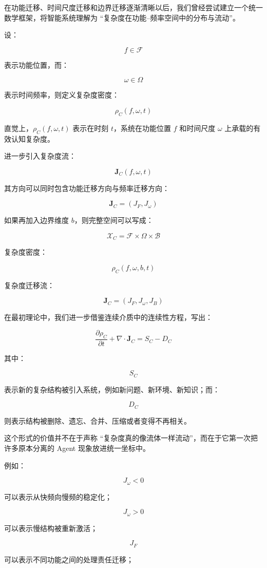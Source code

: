 在功能迁移、时间尺度迁移和边界迁移逐渐清晰以后，我们曾经尝试建立一个统一数学框架，将智能系统理解为 ``复杂度在功能--频率空间中的分布与流动''。

设：

\[
f\in\mathcal F
\]

表示功能位置，而：

\[
\omega\in\Omega
\]

表示时间频率，则定义复杂度密度：

\[
\rho_C(f,\omega,t)
\]

直觉上，$\rho_C(f,\omega,t)$ 表示在时刻 $t$，系统在功能位置 $f$ 和时间尺度 $\omega$ 上承载的有效认知复杂度。

进一步引入复杂度流：

\[
\mathbf J_C(f,\omega,t)
\]

其方向可以同时包含功能迁移方向与频率迁移方向：

\[
\mathbf J_C
=
\left(
J_F,
J_\omega
\right)
\]

如果再加入边界维度 $b$，则完整空间可以写成：

\[
\mathcal X_C
=
\mathcal F
\times
\Omega
\times
\mathcal B
\]

复杂度密度：

\[
\rho_C(f,\omega,b,t)
\]

复杂度迁移流：

\[
\mathbf J_C
=
(
J_F,
J_\omega,
J_B
)
\]

在最初理论中，我们进一步借鉴连续介质中的连续性方程，写出：

\[
\frac{\partial \rho_C}{\partial t}
+
\nabla\cdot\mathbf J_C
=
S_C-D_C
\]

其中：

\[
S_C
\]

表示新的复杂结构被引入系统，例如新问题、新环境、新知识；而：

\[
D_C
\]

则表示结构被删除、遗忘、合并、压缩或者变得不再相关。

这个形式的价值并不在于声称 ``复杂度真的像流体一样流动''，而在于它第一次把许多原本分离的 Agent 现象放进统一坐标中。

例如：

\[
J_\omega<0
\]

可以表示从快频向慢频的稳定化；

\[
J_\omega>0
\]

可以表示慢结构被重新激活；

\[
J_F
\]

可以表示不同功能之间的处理责任迁移；

